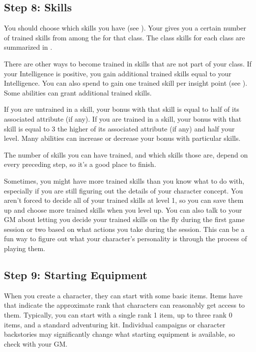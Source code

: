     \subsection{Step 8: Skills}
        You should choose which skills you have  (see ).
        Your  gives you a certain number of trained skills from among the  for that class.
        The class skills for each class are summarized in .

        There are other ways to become trained in skills that are not part of your class.
        If your Intelligence is positive, you gain additional trained skills equal to your Intelligence.
        You can also spend  to gain one trained skill per insight point (see ).
        Some abilities can grant additional trained skills.

        If you are untrained in a skill, your bonus with that skill is equal to half of its associated attribute (if any).
        If you are trained in a skill, your bonus with that skill is equal to 3 \add the higher of its associated attribute (if any) and half your level.
        Many abilities can increase or decrease your bonus with particular skills.

        The number of skills you can have trained, and which skills those are, depend on every preceding step, so it's a good place to finish.

        Sometimes, you might have more trained skills than you know what to do with, especially if you are still figuring out the details of your character concept.
        You aren't forced to decide all of your trained skills at level 1, so you can save them up and choose more trained skills when you level up.
        You can also talk to your GM about letting you decide your trained skills on the fly during the first game session or two based on what actions you take during the session.
        This can be a fun way to figure out what your character's personality is through the process of playing them.

    \subsection{Step 9: Starting Equipment}
        When you create a character, they can start with some basic items.
        Items have  that indicate the approximate rank that characters can reasonably get access to them.
        Typically, you can start with a single rank 1 item, up to three rank 0 items, and a standard adventuring kit.
        Individual campaigns or character backstories may significantly change what starting equipment is available, so check with your GM.

